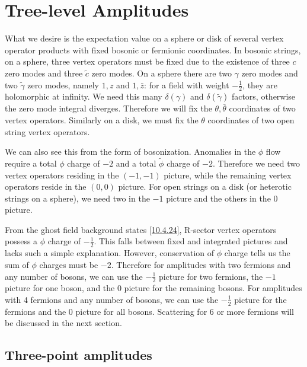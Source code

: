 \section{Tree-level Amplitudes}

What we desire is the expectation value on a sphere or disk of several vertex operator products with fixed bosonic or fermionic coordinates. In bosonic strings, on a sphere, three vertex operators must be fixed due to the existence of three $c$ zero modes and three $\tilde{c}$ zero modes. On a sphere there are two $\gamma$ zero modes and two $\tilde{\gamma}$ zero modes, namely $1,z$ and $1,\bar{z}$: for a field with weight $-\frac{1}{2}$, they are holomorphic at infinity. We need this many $\delta(\gamma)$ and $\delta(\tilde{\gamma})$ factors, otherwise the zero mode integral diverges. Therefore we will fix the $\theta,\bar{\theta}$ coordinates of two vertex operators. Similarly on a disk, we must fix the $\theta$ coordinates of two open string vertex operators.

We can also see this from the form of bosonization. Anomalies in the $\phi$ flow require a total $\phi$ charge of $-2$ and a total $\tilde{\phi}$ charge of $-2$. Therefore we need two vertex operators residing in the $(-1,-1)$ picture, while the remaining vertex operators reside in the $(0,0)$ picture. For open strings on a disk (or heterotic strings on a sphere), we need two in the $-1$ picture and the others in the $0$ picture.

From the ghost field background states \eqref{10.4.24}, R-sector vertex operators possess a $\phi$ charge of $-\tfrac{1}{2}$. This falls between fixed and integrated pictures and lacks such a simple explanation. However, conservation of $\phi$ charge tells us the sum of $\phi$ charges must be $-2$. Therefore for amplitudes with two fermions and any number of bosons, we can use the $-\tfrac{1}{2}$ picture for two fermions, the $-1$ picture for one boson, and the $0$ picture for the remaining bosons. For amplitudes with 4 fermions and any number of bosons, we can use the $-\frac{1}{2}$ picture for the fermions and the $0$ picture for all bosons. Scattering for 6 or more fermions will be discussed in the next section.

\subsection*{Three-point amplitudes}

